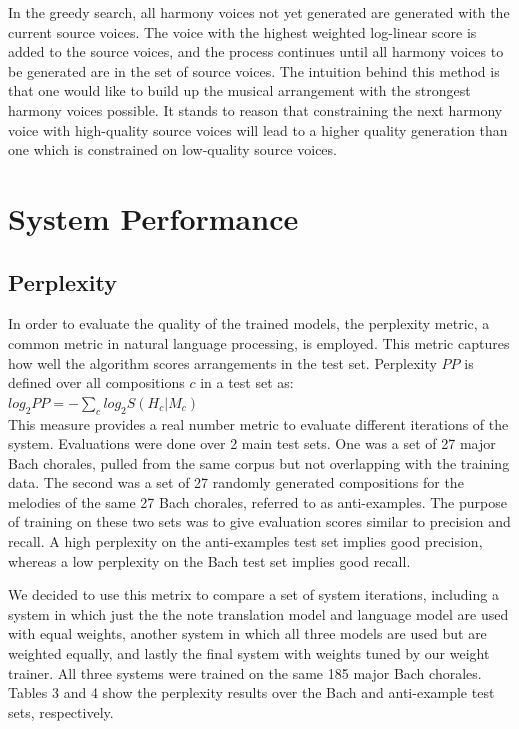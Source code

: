 \documentclass{sig-alternate}
\begin{document}
In the greedy search, all harmony voices not yet generated are generated with the current source voices. The voice with the highest weighted log-linear score is added to the source voices, and the process continues until all harmony voices to be generated are in the set of source voices. The intuition behind this method is that one would like to build up the musical arrangement with the strongest harmony voices possible.
It stands to reason that constraining the next harmony voice with high-quality source voices will lead to a higher quality generation than one which is constrained on low-quality source voices.

\section{System Performance}
\label{sec:sys_perform}
\subsection{Perplexity}
In order to evaluate the quality of the trained models, the perplexity metric, a common metric in natural language processing, is employed. This metric captures how well the algorithm scores arrangements in the test set. Perplexity $PP$ \cite{Koehn:2010:SMT:1734086} is defined over all compositions $c$ in a test set as:\\

$log_2 PP = - \sum_{c} log_2 S(H_{c} | M_{c})$\\

This measure provides a real number metric to evaluate different iterations of the system. Evaluations were done over 2 main test sets. One was a set of 27 major Bach chorales, pulled from the same corpus but not overlapping with the training data. The second was a set of 27 randomly generated compositions for the melodies of the same 27 Bach chorales, referred to as anti-examples. The purpose of training on these two sets was to give evaluation scores similar to precision and recall. A high perplexity on the anti-examples test set implies good precision, whereas a low perplexity on the Bach test set implies good recall. 	

We decided to use this metrix to compare a set of system iterations, including a system in which just the the note translation model and language model are used with equal weights, another system in which all three models are used but are weighted equally, and lastly the final system with weights tuned by our weight trainer. All three systems were trained on the same 185 major Bach chorales. Tables 3 and 4 show the perplexity results over the Bach and anti-example test sets, respectively. 
\end{document}
